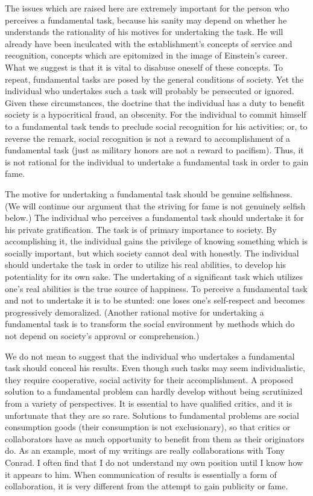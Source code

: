 \documentclass[10pt,twoside,draft]{memoir}
\begin{document}
{{{The issues which are raised here are extremely important for the person 
who perceives a fundamental task, because his sanity may depend on 
whether he understands the rationality of his motives for undertaking the 
task. He will already have been inculcated with the establishment's concepts 
of service and recognition, concepts which are epitomized in the image of 
Einstein's career. What we suggest is that it is vital to disabuse oneself of 
these concepts. To repeat, fundamental tasks are posed by the general 
conditions of society. Yet the individual who undertakes such a task will 
probably be persecuted or ignored. Given these circumstances, the doctrine 
that the individual has a duty to benefit society is a hypocritical fraud, an 
obscenity. For the individual to commit himself to a fundamental task tends 
to preclude social recognition for his activities; or, to reverse the remark, 
social recognition is not a reward to accomplishment of a fundamental task 
(just as military honors are not a reward to pacifism). Thus, it is not rational 
for the individual to undertake a fundamental task in order to gain fame. 

The motive for undertaking a fundamental task should be genuine 
selfishness. (We will continue our argument that the striving for fame is not 
genuinely selfish below.) The individual who perceives a fundamental task 
should undertake it for his private gratification. The task is of primary 
importance to society. By accomplishing it, the individual gains the privilege 
of knowing something which is socially important, but which society cannot 
deal with honestly. The individual should undertake the task in order to 
utilize his real abilities, to develop his potentiality for its own sake. The 
undertaking of a significant task which utilizes one's real abilities is the true 
source of happiness. To perceive a fundamental task and not to undertake it 
is to be stunted: one loses one's self-respect and becomes progressively 
demoralized. (Another rational motive for undertaking a fundamental task is 
to transform the social environment by methods which do not depend on 
society's approval or comprehension.) 

We do not mean to suggest that the individual who undertakes a 
fundamental task should conceal his results. Even though such tasks may 
seem individualistic, they require cooperative, social activity for their 
accomplishment. A proposed solution to a fundamental problem can hardly 
develop without being scrutinized from a variety of perspectives. It is 
essential to have qualified critics, and it is unfortunate that they are so rare. 
Solutions to fundamental problems are social consumption goods (their 
consumption is not exclusionary), so that critics or collaborators have as 
much opportunity to benefit from them as their originators do. As an 
example, most of my writings are really collaborations with Tony Conrad. I 
often find that I do not understand my own position until I know how it 
appears to him. When communication of results is essentially a form of 
collaboration, it is very different from the attempt to gain publicity or fame. 

}}}
\end{document}
